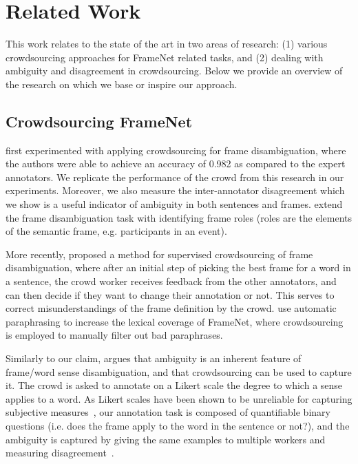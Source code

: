 \section{Related Work}
This work relates to the state of the art in two areas of research: (1) various crowdsourcing approaches for FrameNet related tasks, and (2) dealing with ambiguity and disagreement in crowdsourcing. Below we provide an overview of the research on which we base or inspire our approach. 
\subsection{Crowdsourcing FrameNet}

\citet{Hong:2011:GCR:2018966.2018970} first experimented with applying crowdsourcing for frame disambiguation, where the authors were able to achieve an accuracy of 0.982 as compared to the expert annotators. We replicate the performance of the crowd from this research in our experiments. Moreover, we also measure the inter-annotator disagreement which we show is a useful indicator of ambiguity in both sentences and frames. \citet{fossati2013outsourcing} extend the frame disambiguation task with identifying frame roles (roles are the elements of the semantic frame, e.g. participants in an event).

More recently, \citet{chang2015scaling} proposed a method for supervised crowdsourcing of frame disambiguation, where after an initial step of picking the best frame for a word in a sentence, the crowd worker receives feedback from the other annotators, and can then decide if they want to change their annotation or not. This serves to correct misunderstandings of the frame definition by the crowd. \citet{pavlick2015framenet+} use automatic paraphrasing to increase the lexical coverage of FrameNet, where crowdsourcing is employed to manually filter out bad paraphrases.

Similarly to our claim, \citet{jurgens2013embracing} argues that ambiguity is an inherent feature of frame/word sense disambiguation, and that crowdsourcing can be used to capture it. The crowd is asked to annotate on a Likert scale the degree to which a sense applies to a word. As Likert scales have been shown to be unreliable for capturing subjective measures~\cite{Kittur2008}, our annotation task is composed of quantifiable binary questions (i.e. does the frame apply to the word in the sentence or not?), and the ambiguity is captured by giving the same examples to multiple workers and measuring disagreement~\cite{aroyo2014threesides}.

